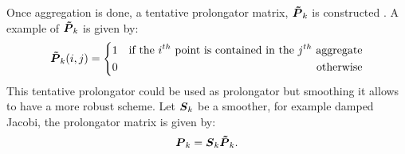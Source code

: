 {Once aggregation is done, a tentative prolongator matrix, $\boldsymbol{\tilde{P}}_k$ 
is constructed \cite{mis}. A example of $\boldsymbol{\tilde{P}}_k$ is given by:
\begin{equation}
  \boldsymbol{\tilde{P}}_k(i,j) = \left\{
  \begin{aligned}
    &1 &\textrm{if the }i^{th}\textrm{ point is contained in the }j^{th}\textrm{
    aggregate}\\
    & 0 &\textrm{otherwise}
  \end{aligned}
  \right.
\end{equation}
This tentative prolongator could be used as prolongator but smoothing it
allows to have a more robust scheme. Let $\boldsymbol{S}_k$ be a smoother, for example
damped Jacobi, the prolongator matrix is given by:
\begin{equation}
  \boldsymbol{P}_k = \boldsymbol{S}_k \boldsymbol{\tilde{P}}_k.
\end{equation}

}
